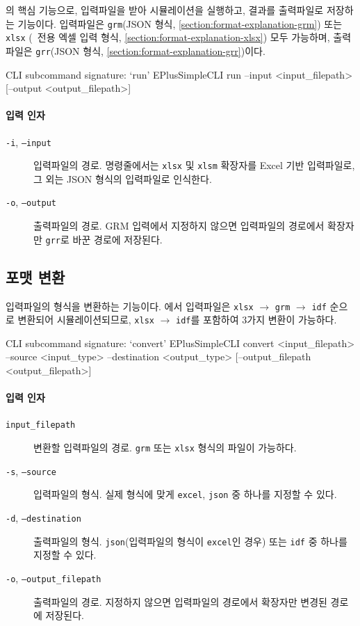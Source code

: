 \simulator 의 핵심 기능으로, 입력파일을 받아 시뮬레이션을 실행하고, 결과를 출력파일로 저장하는 기능이다. 입력파일은 \texttt{grm}(JSON 형식, \ref{section:format-explanation-grm}) 또는 \texttt{xlsx} (\simulator\ 전용 엑셀 입력 형식, \ref{section:format-explanation-xlsx}) 모두 가능하며, 출력파일은 \texttt{grr}(JSON 형식, \ref{section:format-explanation-grr})이다.

\begin{codeblock}{CLI subcommand signature: `run'}
EPlusSimpleCLI run --input <input_filepath> [--output <output_filepath>]
\end{codeblock}

\paragraph{입력 인자}
\begin{description}
  \item[\texttt{-i}, \texttt{--input}] 입력파일의 경로. 명령줄에서는 \texttt{xlsx} 및 \texttt{xlsm} 확장자를 Excel 기반 입력파일로, 그 외는 JSON 형식의 입력파일로 인식한다.
  \item[\texttt{-o}, \texttt{--output}] 출력파일의 경로. GRM 입력에서 지정하지 않으면 입력파일의 경로에서 확장자만 \texttt{grr}로 바꾼 경로에 저장된다.
\end{description}

\subsection{포맷 변환}
\label{subsection:clisubcommands-convert}

입력파일의 형식을 변환하는 기능이다. \simulator 에서 입력파일은 \texttt{xlsx} $\rightarrow$ \texttt{grm} $\rightarrow$ \texttt{idf} 순으로 변환되어 시뮬레이션되므로, \texttt{xlsx} $\rightarrow$ \texttt{idf}를 포함하여 3가지 변환이 가능하다.

\begin{codeblock}{CLI subcommand signature: `convert'}
EPlusSimpleCLI convert <input_filepath> --source <input_type> --destination <output_type> [--output_filepath <output_filepath>]
\end{codeblock}

\paragraph{입력 인자}
\begin{description}
  \item[\texttt{input\_filepath}] 변환할 입력파일의 경로. \texttt{grm} 또는 \texttt{xlsx} 형식의 파일이 가능하다.
  \item[\texttt{-s}, \texttt{--source}] 입력파일의 형식. 실제 형식에 맞게 \texttt{excel}, \texttt{json} 중 하나를 지정할 수 있다.
  \item[\texttt{-d}, \texttt{--destination}] 출력파일의 형식. \texttt{json}(입력파일의 형식이 \texttt{excel}인 경우) 또는 \texttt{idf} 중 하나를 지정할 수 있다.
  \item[\texttt{-o}, \texttt{--output\_filepath}] 출력파일의 경로. 지정하지 않으면 입력파일의 경로에서 확장자만 변경된 경로에 저장된다.
\end{description}


